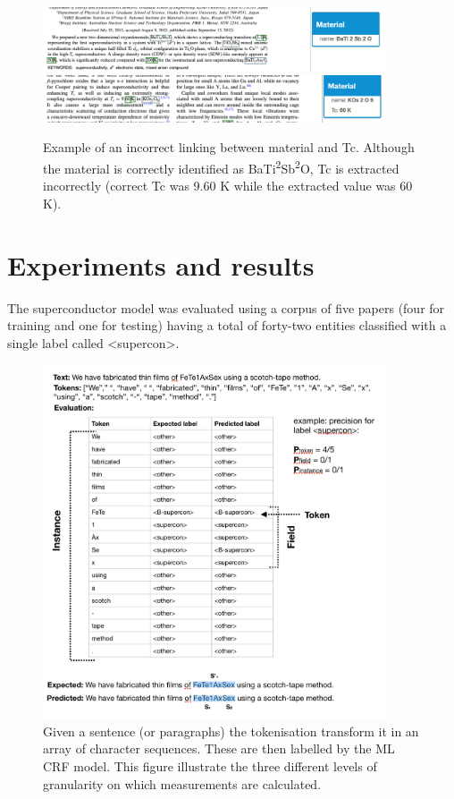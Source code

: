 \documentclass{article}[a4]
\begin{document}
\begin{figure}[h]
    \centering
    \includegraphics[width=4in]{example-bad1} 
    \includegraphics[width=4in]{example-bad2}
    \caption{Example of an incorrect linking between material and Tc. Although the material is correctly identified as BaTi\textsuperscript{2}Sb\textsuperscript{2}O, Tc is extracted incorrectly (correct Tc was 9.60 K while the extracted value was 60 K). }
    \label{fig:example-not-working}
\end{figure}

\section{Experiments and results}
\label{sec:experiments-results}


The superconductor model was evaluated using a corpus of five papers (four for training and one for testing) having a total of forty-two entities classified with a single label called  \textless supercon\textgreater.

\begin{figure}[h!]
    \centering
    \includegraphics[width=4in]{example-output}
    \caption{Given a sentence (or paragraphs) the tokenisation transform it in an array of character sequences. These are then labelled by the ML CRF model. This figure illustrate the three different levels of granularity on which measurements are calculated.}
    \label{fig:levels-measurement}
\end{figure}
\end{document}
